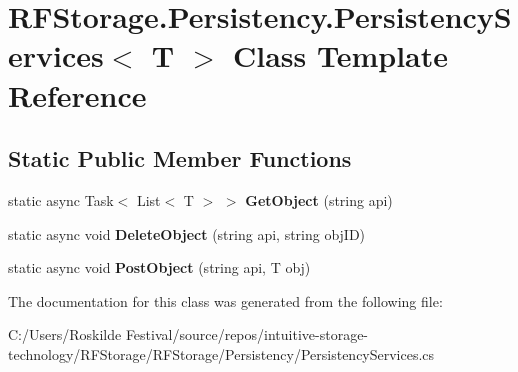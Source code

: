 \section{R\+F\+Storage.\+Persistency.\+Persistency\+Services$<$ T $>$ Class Template Reference}
\label{class_r_f_storage_1_1_persistency_1_1_persistency_services}
\subsection*{Static Public Member Functions}
\begin{DoxyCompactItemize}
\item 
\mbox{\label{class_r_f_storage_1_1_persistency_1_1_persistency_services_a041b9aad843c198aa6a4e3676c42e6f2}} 
static async Task$<$ List$<$ T $>$ $>$ {\bfseries Get\+Object} (string api)
\item 
\mbox{\label{class_r_f_storage_1_1_persistency_1_1_persistency_services_aff43d7280709a949b60ae684fffe30f5}} 
static async void {\bfseries Delete\+Object} (string api, string obj\+ID)
\item 
\mbox{\label{class_r_f_storage_1_1_persistency_1_1_persistency_services_a0ee031903d49c842de09d19c1273b944}} 
static async void {\bfseries Post\+Object} (string api, T obj)
\end{DoxyCompactItemize}


The documentation for this class was generated from the following file\+:\begin{DoxyCompactItemize}
\item 
C\+:/\+Users/\+Roskilde Festival/source/repos/intuitive-\/storage-\/technology/\+R\+F\+Storage/\+R\+F\+Storage/\+Persistency/Persistency\+Services.\+cs\end{DoxyCompactItemize}
